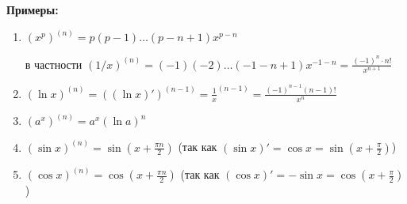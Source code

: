 \textbf{Примеры:}

\begin{enumerate}
    \item $(x^p)^{(n)} = p(p-1) \dots (p-n+1) x^{p-n}$
    
    в частности $(1/x)^{(n)} = (-1)(-2) \dots (-1-n+1) x^{-1-n} = \frac{(-1)^n \cdot n!}{x^{n+1}}$

    \item $(\ln x)^{(n)} = ((\ln x)')^{(n-1)} = \frac{1}{x}^{(n-1)} = \frac{(-1)^{n-1} (n-1)!}{x^n}$
    \item $(a^x)^{(n)} = a^x (\ln a)^n$
    \item $(\sin x)^{(n)} = \sin(x + \frac{\pi n}{2})$ (так как $(\sin x)' = \cos x = \sin (x + \frac{\pi}{2})$)
    \item $(\cos x)^{(n)} = \cos(x + \frac{\pi n}{2})$ (так как $(\cos x)' = -\sin x = \cos (x + \frac{\pi}{2})$)
\end{enumerate}

